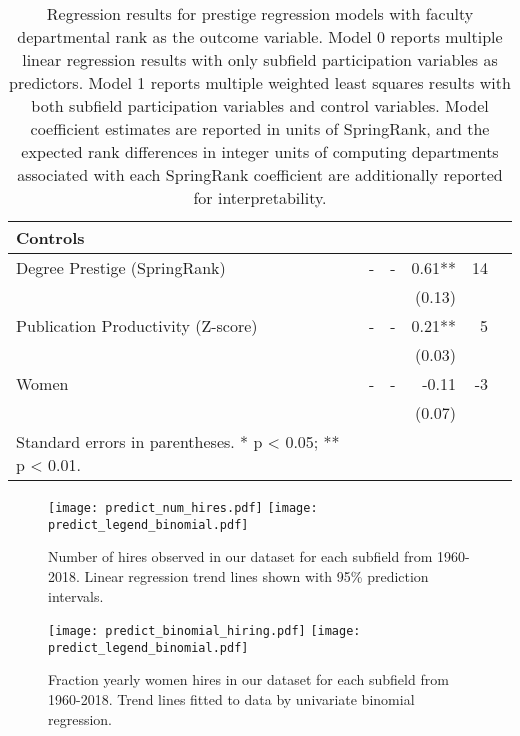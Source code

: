 \documentclass[reprint, twocolumn, aps, nofootinbib, superscriptaddress, longbibliography]{revtex4-1}
\begin{document}
\begin{table*}
\begin{tabular}{l *{5}{d{7.3}}}
\textbf{Controls} & & & & \\ 
\midrule 
\quad Degree Prestige (SpringRank) & - & - & 0.61** & 14 \\ 
\quad & & & (0.13) & \\ 
\quad \rule{0pt}{4ex}Publication Productivity (Z-score) & - & - & 0.21** & 5 \\ 
\quad & & & (0.03) & \\ 
\quad \rule{0pt}{4ex}Women & - & - & -0.11 & -3 \\ 
\quad & & & (0.07) & \\ 
\bottomrule 
\tiny{Standard errors in parentheses. * p < 0.05; ** p < 0.01.} & & \\ 
\end{tabular} 
\caption{ Regression results for prestige regression models with faculty departmental rank as the outcome variable. Model 0 reports multiple linear regression results with only subfield participation variables as predictors. Model 1 reports multiple weighted least squares results with both subfield participation variables and control variables. Model coefficient estimates are reported in units of SpringRank, and the expected rank differences in integer units of computing departments associated with each SpringRank coefficient are additionally reported for interpretability.}\label{tab:regression} 
\end{table*} 

\begin{figure*}[t] 
\texttt{[image: predict\_num\_hires.pdf]} 
\texttt{[image: predict\_legend\_binomial.pdf]} 
\caption{Number of hires observed in our dataset for each subfield from 1960-2018. Linear regression trend lines shown with 95\% prediction intervals.}\label{fig:predict_num_hires} 
\end{figure*} 

\begin{figure*}[t] 
\texttt{[image: predict\_binomial\_hiring.pdf]} 
\texttt{[image: predict\_legend\_binomial.pdf]} 
\caption{Fraction yearly women hires in our dataset for each subfield from 1960-2018. Trend lines fitted to data by univariate binomial regression.}\label{fig:predict_binomial_hiring} 
\end{figure*} 
\end{document}
